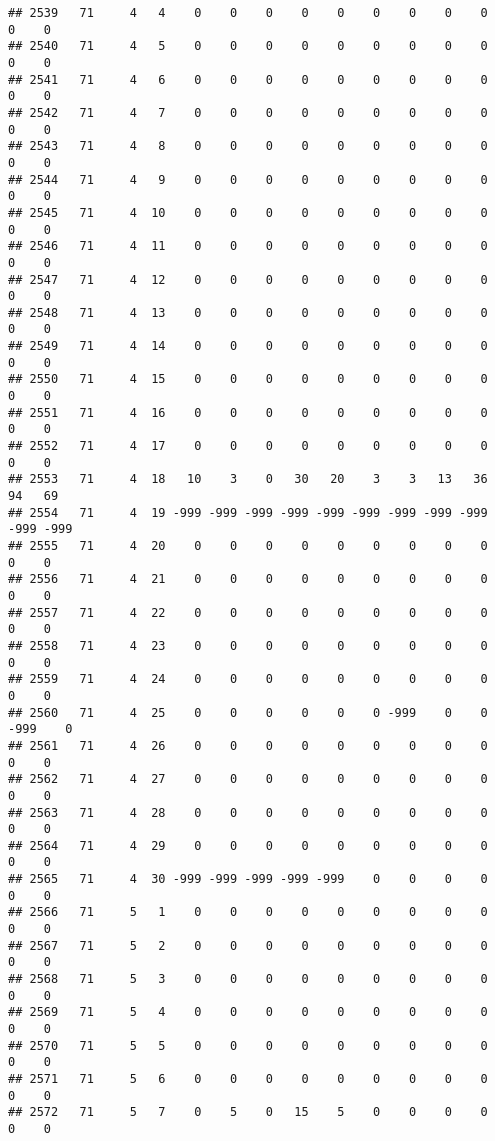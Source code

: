 \documentclass[]{article}
\begin{document}
\begin{verbatim}
## 2539   71     4   4    0    0    0    0    0    0    0    0    0    0    0
## 2540   71     4   5    0    0    0    0    0    0    0    0    0    0    0
## 2541   71     4   6    0    0    0    0    0    0    0    0    0    0    0
## 2542   71     4   7    0    0    0    0    0    0    0    0    0    0    0
## 2543   71     4   8    0    0    0    0    0    0    0    0    0    0    0
## 2544   71     4   9    0    0    0    0    0    0    0    0    0    0    0
## 2545   71     4  10    0    0    0    0    0    0    0    0    0    0    0
## 2546   71     4  11    0    0    0    0    0    0    0    0    0    0    0
## 2547   71     4  12    0    0    0    0    0    0    0    0    0    0    0
## 2548   71     4  13    0    0    0    0    0    0    0    0    0    0    0
## 2549   71     4  14    0    0    0    0    0    0    0    0    0    0    0
## 2550   71     4  15    0    0    0    0    0    0    0    0    0    0    0
## 2551   71     4  16    0    0    0    0    0    0    0    0    0    0    0
## 2552   71     4  17    0    0    0    0    0    0    0    0    0    0    0
## 2553   71     4  18   10    3    0   30   20    3    3   13   36   94   69
## 2554   71     4  19 -999 -999 -999 -999 -999 -999 -999 -999 -999 -999 -999
## 2555   71     4  20    0    0    0    0    0    0    0    0    0    0    0
## 2556   71     4  21    0    0    0    0    0    0    0    0    0    0    0
## 2557   71     4  22    0    0    0    0    0    0    0    0    0    0    0
## 2558   71     4  23    0    0    0    0    0    0    0    0    0    0    0
## 2559   71     4  24    0    0    0    0    0    0    0    0    0    0    0
## 2560   71     4  25    0    0    0    0    0    0 -999    0    0 -999    0
## 2561   71     4  26    0    0    0    0    0    0    0    0    0    0    0
## 2562   71     4  27    0    0    0    0    0    0    0    0    0    0    0
## 2563   71     4  28    0    0    0    0    0    0    0    0    0    0    0
## 2564   71     4  29    0    0    0    0    0    0    0    0    0    0    0
## 2565   71     4  30 -999 -999 -999 -999 -999    0    0    0    0    0    0
## 2566   71     5   1    0    0    0    0    0    0    0    0    0    0    0
## 2567   71     5   2    0    0    0    0    0    0    0    0    0    0    0
## 2568   71     5   3    0    0    0    0    0    0    0    0    0    0    0
## 2569   71     5   4    0    0    0    0    0    0    0    0    0    0    0
## 2570   71     5   5    0    0    0    0    0    0    0    0    0    0    0
## 2571   71     5   6    0    0    0    0    0    0    0    0    0    0    0
## 2572   71     5   7    0    5    0   15    5    0    0    0    0    0    0

\end{verbatim}
\end{document}
